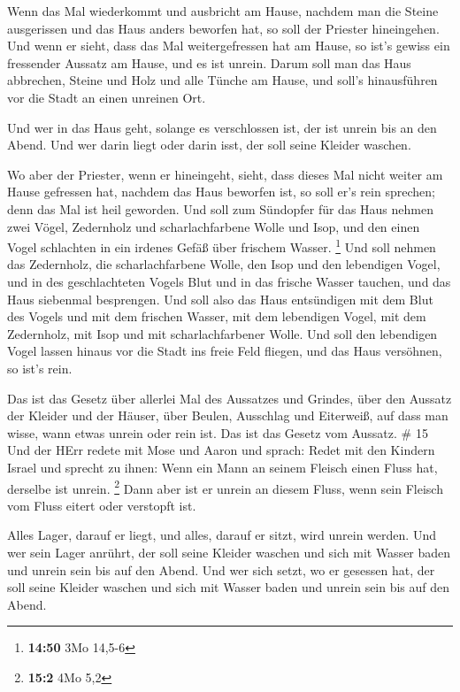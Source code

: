  Wenn das Mal wiederkommt und ausbricht am Hause, nachdem
man die Steine ausgerissen und das Haus anders beworfen hat,
 so soll der Priester hineingehen. Und wenn er sieht, dass
das Mal weitergefressen hat am Hause, so ist's gewiss ein fressender
Aussatz am Hause, und es ist unrein.  Darum soll man das
Haus abbrechen, Steine und Holz und alle Tünche am Hause, und soll's
hinausführen vor die Stadt an einen unreinen Ort.

 Und wer in das Haus geht, solange es verschlossen ist, der
ist unrein bis an den Abend.  Und wer darin liegt oder
darin isst, der soll seine Kleider waschen.

 Wo aber der Priester, wenn er hineingeht, sieht, dass
dieses Mal nicht weiter am Hause gefressen hat, nachdem das Haus
beworfen ist, so soll er's rein sprechen; denn das Mal ist heil
geworden.  Und soll zum Sündopfer für das Haus nehmen zwei
Vögel, Zedernholz und scharlachfarbene Wolle und Isop,  und
den einen Vogel schlachten in ein irdenes Gefäß über frischem Wasser.
\footnote{\textbf{14:50} 3Mo 14,5-6}  Und soll nehmen das
Zedernholz, die scharlachfarbene Wolle, den Isop und den lebendigen
Vogel, und in des geschlachteten Vogels Blut und in das frische Wasser
tauchen, und das Haus siebenmal besprengen.  Und soll also
das Haus entsündigen mit dem Blut des Vogels und mit dem frischen
Wasser, mit dem lebendigen Vogel, mit dem Zedernholz, mit Isop und mit
scharlachfarbener Wolle.  Und soll den lebendigen Vogel
lassen hinaus vor die Stadt ins freie Feld fliegen, und das Haus
versöhnen, so ist's rein.

 Das ist das Gesetz über allerlei Mal des Aussatzes und
Grindes,  über den Aussatz der Kleider und der Häuser,
 über Beulen, Ausschlag und Eiterweiß,  auf
dass man wisse, wann etwas unrein oder rein ist. Das ist das Gesetz vom
Aussatz. \# 15  Und der HErr redete mit Mose und Aaron und
sprach:  Redet mit den Kindern Israel und sprecht zu ihnen:
Wenn ein Mann an seinem Fleisch einen Fluss hat, derselbe ist unrein.
\footnote{\textbf{15:2} 4Mo 5,2}  Dann aber ist er unrein an
diesem Fluss, wenn sein Fleisch vom Fluss eitert oder verstopft ist.

 Alles Lager, darauf er liegt, und alles, darauf er sitzt,
wird unrein werden.  Und wer sein Lager anrührt, der soll
seine Kleider waschen und sich mit Wasser baden und unrein sein bis auf
den Abend.  Und wer sich setzt, wo er gesessen hat, der soll
seine Kleider waschen und sich mit Wasser baden und unrein sein bis auf
den Abend.

